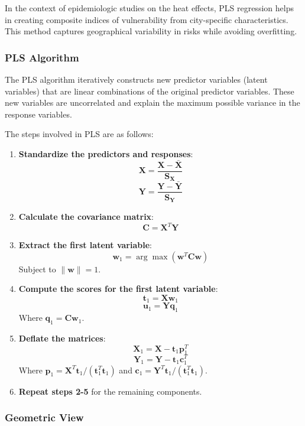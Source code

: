 \documentclass[
]{krantz}
\begin{document}
In the context of epidemiologic studies on the heat effects, PLS regression helps in creating composite indices of vulnerability from city-specific characteristics. This method captures geographical variability in risks while avoiding overfitting.

\subsubsection{PLS Algorithm}\label{pls-algorithm}

The PLS algorithm iteratively constructs new predictor variables (latent variables) that are linear combinations of the original predictor variables. These new variables are uncorrelated and explain the maximum possible variance in the response variables.

The steps involved in PLS are as follows:

\begin{enumerate}
\def\labelenumi{\arabic{enumi}.}
\item
  \textbf{Standardize the predictors and responses}:
  \[
  \mathbf{X} = \frac{\mathbf{X} - \mathbf{\bar{X}}}{\mathbf{S_X}}
  \]
  \[
  \mathbf{Y} = \frac{\mathbf{Y} - \mathbf{\bar{Y}}}{\mathbf{S_Y}}
  \]
\item
  \textbf{Calculate the covariance matrix}:
  \[
  \mathbf{C} = \mathbf{X}^T \mathbf{Y}
  \]
\item
  \textbf{Extract the first latent variable}:
  \[
  \mathbf{w}_1 = \arg \max \left( \mathbf{w}^T \mathbf{C} \mathbf{w} \right)
  \]
  Subject to \(\|\mathbf{w}\| = 1\).
\item
  \textbf{Compute the scores for the first latent variable}:
  \[
  \mathbf{t}_1 = \mathbf{X} \mathbf{w}_1
  \]
  \[
  \mathbf{u}_1 = \mathbf{Y} \mathbf{q}_1
  \]
  Where \(\mathbf{q}_1 = \mathbf{C} \mathbf{w}_1\).
\item
  \textbf{Deflate the matrices}:
  \[
  \mathbf{X}_1 = \mathbf{X} - \mathbf{t}_1 \mathbf{p}_1^T
  \]
  \[
  \mathbf{Y}_1 = \mathbf{Y} - \mathbf{t}_1 \mathbf{c}_1^T
  \]
  Where \(\mathbf{p}_1 = \mathbf{X}^T \mathbf{t}_1 / (\mathbf{t}_1^T \mathbf{t}_1)\) and \(\mathbf{c}_1 = \mathbf{Y}^T \mathbf{t}_1 / (\mathbf{t}_1^T \mathbf{t}_1)\).
\item
  \textbf{Repeat steps 2-5} for the remaining components.
\end{enumerate}

\subsubsection{Geometric View}\label{geometric-view}
\end{document}

